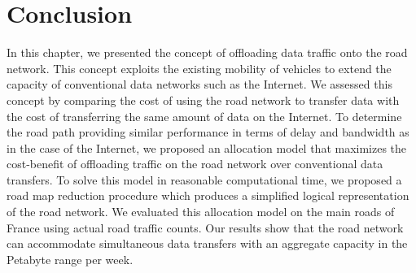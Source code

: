 \section{Conclusion}
\label{sec:revenue-maximization-conclusions}

In this chapter, we presented the concept of offloading data traffic onto the road network. This concept exploits the existing mobility of vehicles to extend the capacity of conventional data networks such as the Internet. We assessed this concept by comparing the cost of using the road network to transfer data with the cost of transferring the same amount of data on the Internet. To determine the road path providing similar performance in terms of delay and bandwidth as in the case of the Internet, we proposed an allocation model that maximizes the cost-benefit of offloading traffic on the road network over conventional data transfers. To solve this model in reasonable computational time, we proposed a road map reduction procedure which produces a simplified logical representation of the road network.  
We evaluated this allocation model on the main roads of France using actual road traffic counts. Our results show that the road network can accommodate simultaneous data transfers with an aggregate capacity in the Petabyte range per week.


